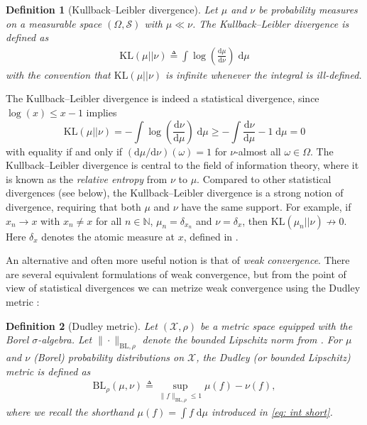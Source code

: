 \documentclass[12pt,paper=letter]{scrreprt}
\newtheorem{definition}{Definition}[chapter]
\def\defeq{\triangleq} %
\begin{document}
\begin{definition}[Kullback--Leibler divergence]
\label{def: KL divergence}
    Let $\mu$ and $\nu$ be probability measures on a measurable space $(\Omega,\mathcal{S})$ with $\mu \ll \nu$.
    The \emph{Kullback--Leibler divergence} is defined as
    \begin{align*}
        \mathrm{KL}(\mu || \nu) \defeq \int \log \left( \frac{\mathrm{d}\mu}{\mathrm{d}\nu} \right) \; \mathrm{d} \mu
    \end{align*}
    with the convention that $\mathrm{KL}(\mu || \nu)$ is infinite whenever the integral is ill-defined.
\end{definition}

The Kullback--Leibler divergence is indeed a statistical divergence, since $\log(x) \leq x - 1$ implies $$
\mathrm{KL}(\mu || \nu) = - \int \log \left(\frac{\mathrm{d}\nu}{\mathrm{d}\mu} \right) \; \mathrm{d}\mu \geq - \int \frac{\mathrm{d}\nu}{\mathrm{d}\mu} - 1 \; \mathrm{d}\mu = 0
$$ 
with equality if and only if $(\mathrm{d}\mu / \mathrm{d}\nu)(\omega) = 1$ for $\nu$-almost all $\omega \in \Omega$.
The Kullback--Leibler divergence is central to the field of information theory, where it is known as the \emph{relative entropy} from $\nu$ to $\mu$.
Compared to other statistical divergences (see below), the Kullback--Leibler divergence is a strong notion of divergence, requiring that both $\mu$ and $\nu$ have the same support.
For example, if $x_n \rightarrow x$ with $x_n \neq x$ for all $n \in \mathbb{N}$, $\mu_n = \delta_{x_n}$ and $\nu = \delta_x$, then $\mathrm{KL}(\mu_n || \nu) \nrightarrow 0$.
Here $\delta_x$ denotes the atomic measure at $x$, defined in .

An alternative and often more useful notion is that of \emph{weak convergence}.
There are several equivalent formulations of weak convergence, but from the point of view of statistical divergences we can metrize weak convergence using the Dudley metric \citep[][Chapter 11]{dudley2018real}:

\begin{definition}[Dudley metric]
    \label{def: dudley metric}
    Let $(\mathcal{X},\rho)$ be a metric space equipped with the Borel $\sigma$-algebra.
    Let $\|\cdot\|_{\text{BL},\rho}$ denote the bounded Lipschitz norm from .
    For $\mu$ and $\nu$ (Borel) probability distributions on $\mathcal{X}$, the \emph{Dudley} (or \emph{bounded Lipschitz}) \emph{metric} is defined as
    \begin{align*}
    \mathrm{BL}_\rho(\mu,\nu) \defeq \sup_{\|f\|_{\text{BL},\rho} \leq 1} \mu(f) - \nu(f) ,
    \end{align*}
    where we recall the shorthand $\mu(f) = \int f \; \mathrm{d}\mu$ introduced in \eqref{eq: int short}.
\end{definition}
\end{document}
